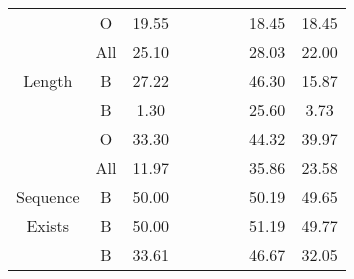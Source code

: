 \begin{tabular}{cccllllcc}
\rowcolor[HTML]{F3F3F3} 
\cellcolor[HTML]{F3F3F3}                          & O                    & 19.55                                             &                       &                        &                       &                        & 18.45       & 18.45      \\
\rowcolor[HTML]{F3F3F3} 
\multirow{-3}{*}{\cellcolor[HTML]{F3F3F3}Last}    & All                  & 25.10                                             &                       &                        &                       &                        & 28.03       & 22.00      \\
Length                                            & B                    & 27.22                                             &                       &                        &                       &                        & 46.30       & 15.87      \\
\rowcolor[HTML]{F3F3F3} 
\cellcolor[HTML]{F3F3F3}                          & B                    & 1.30                                              &                       &                        &                       &                        & 25.60       & 3.73       \\
\rowcolor[HTML]{F3F3F3} 
\cellcolor[HTML]{F3F3F3}                          & O                    & 33.30                                             &                       &                        &                       &                        & 44.32       & 39.97      \\
\rowcolor[HTML]{F3F3F3} 
\multirow{-3}{*}{\cellcolor[HTML]{F3F3F3}Count}   & All                  & 11.97                                             &                       &                        &                       &                        & 35.86       & 23.58      \\
Sequence                                          & B                    & 50.00                                             &                       &                        &                       &                        & 50.19       & 49.65      \\
\rowcolor[HTML]{F3F3F3} 
Exists                                            & B                    & 50.00                                             &                       &                        &                       &                        & 51.19       & 49.77      \\
                                                  & B                    & 33.61                                             &                       &                        &                       &                        & 46.67       & 32.05      \\

\end{tabular}
